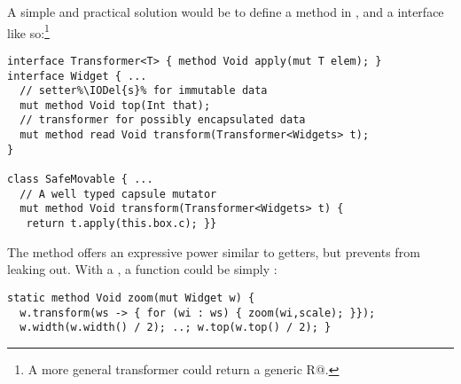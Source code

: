 A simple and practical solution would be to define a \Q@transform@ method in \Q@Widget@, and a \Q@Transformer@ interface 
like so:\footnote{A more general transformer could return a generic \Q@read R@.}
\begin{lstlisting}[escapechar=\%]
interface Transformer<T> { method Void apply(mut T elem); }
interface Widget { ...
  // setter%\IODel{s}% for immutable data
  mut method Void top(Int that);
  // transformer for possibly encapsulated data
  mut method read Void transform(Transformer<Widgets> t);
}

class SafeMovable { ...
  // A well typed capsule mutator
  mut method Void transform(Transformer<Widgets> t) {
   return t.apply(this.box.c); }}
\end{lstlisting}\saveSpace
The \Q@transform@ method offers an expressive power similar to \Q@mut@ getters, but prevents \Q@Widgets@ from leaking out.  With a \Q@Transformer@, a \Q@zoom@ function could be simply :
\begin{lstlisting}
static method Void zoom(mut Widget w) {
  w.transform(ws -> { for (wi : ws) { zoom(wi,scale); }});
  w.width(w.width() / 2); ..; w.top(w.top() / 2); }
\end{lstlisting}




